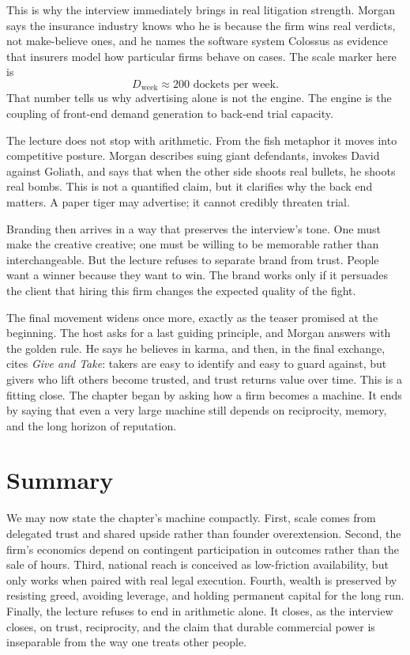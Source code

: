 This is why the interview immediately brings in real litigation strength. Morgan says the insurance industry knows who he is because the firm wins real verdicts, not make-believe ones, and he names the software system Colossus as evidence that insurers model how particular firms behave on cases. The scale marker here is
\begin{equation}
D_{\mathrm{week}} \approx 200 \text{ dockets per week}.
\end{equation}
That number tells us why advertising alone is not the engine. The engine is the coupling of front-end demand generation to back-end trial capacity.

The lecture does not stop with arithmetic. From the fish metaphor it moves into competitive posture. Morgan describes suing giant defendants, invokes David against Goliath, and says that when the other side shoots real bullets, he shoots real bombs. This is not a quantified claim, but it clarifies why the back end matters. A paper tiger may advertise; it cannot credibly threaten trial.

Branding then arrives in a way that preserves the interview's tone. One must make the creative creative; one must be willing to be memorable rather than interchangeable. But the lecture refuses to separate brand from trust. People want a winner because they want to win. The brand works only if it persuades the client that hiring this firm changes the expected quality of the fight.

The final movement widens once more, exactly as the teaser promised at the beginning. The host asks for a last guiding principle, and Morgan answers with the golden rule. He says he believes in karma, and then, in the final exchange, cites \emph{Give and Take}: takers are easy to identify and easy to guard against, but givers who lift others become trusted, and trust returns value over time. This is a fitting close. The chapter began by asking how a firm becomes a machine. It ends by saying that even a very large machine still depends on reciprocity, memory, and the long horizon of reputation.

\section{Summary}

We may now state the chapter's machine compactly. First, scale comes from delegated trust and shared upside rather than founder overextension. Second, the firm's economics depend on contingent participation in outcomes rather than the sale of hours. Third, national reach is conceived as low-friction availability, but only works when paired with real legal execution. Fourth, wealth is preserved by resisting greed, avoiding leverage, and holding permanent capital for the long run. Finally, the lecture refuses to end in arithmetic alone. It closes, as the interview closes, on trust, reciprocity, and the claim that durable commercial power is inseparable from the way one treats other people.